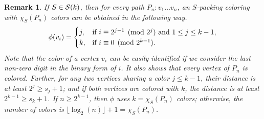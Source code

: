 \documentclass[12pt]{article}
\newtheorem{remark}[theorem]{Remark}
\newcommand{\cS}{{\cal S}}
\begin{document}
\begin{remark} 
       If $S \in \cS(k)$, then for every path $P_n\colon v_1 \dots v_n$, an $S$-packing coloring with $\chi_S(P_n)$ colors can be obtained in the following way. 
        \begin{equation} \label{eq:coloring}
            \phi(v_i)=     \begin{cases} 	j, &\text{if $ i \equiv 2^{j-1} \pmod{2^{j}}$ and $1 \leq j \leq k-1$},\\	
        k, &\text{if $ i \equiv 0 \pmod{2^{k-1}}$.}\\    \end{cases}  
        \end{equation}     
         Note that the color of a vertex $v_i$ can be easily identified if we consider the last non-zero digit in the binary form of $i$. It also shows that every vertex of $P_n$ is colored.  Further, for any two vertices sharing a color $j \leq k-1$, their distance is at least $2^j \ge s_j+1$; and if both vertices are colored with $k$, the distance is  at least $2^{k-1} \ge s_k+1$. If $n \ge 2^{k-1}$, then $\phi $ uses $k=\chi_S(P_n)$ colors; otherwise, the number of colors is $\lfloor \log_2(n) \rfloor +1=\chi_S(P_n)$.
     \end{remark}
     
\end{document}
